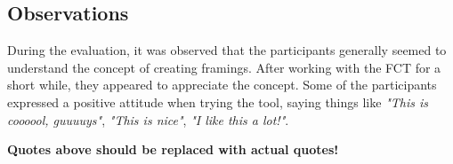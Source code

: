 \subsection{Observations}
During the evaluation, it was observed that the participants generally seemed to understand the concept of creating framings. After working with the FCT for a short while, they appeared to appreciate the concept. Some of the participants expressed a positive attitude when trying the tool, saying things like \textit{"This is coooool, guuuuys"}, \textit{"This is nice"}, \textit{"I like this a lot!"}.

\textbf{Quotes above should be replaced with actual quotes!}